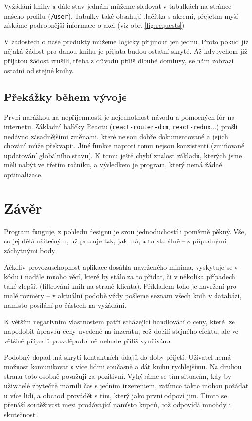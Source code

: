 \documentclass[a4paper,oneside,12pt]{report}
\begin{document}
Vyžádání knihy a dále stav jednání můžeme sledovat v\,\,tabulkách na stránce našeho
profilu (\texttt{/user}). Tabulky také obsahují tlačítka s akcemi, přejetím myší
získáme podrobnější informace o akci (viz obr. \ref{fig:requests})

V žádostech o naše produkty můžeme logicky přijmout jen jednu. Proto pokud již nějaká
žádost pro danou knihu je přijata budou ostatní skryté. Až kdybychom již přijatou žádost
zrušili, třeba z důvodů příliš dlouhé domluvy, se nám zobrazí ostatní od stejné knihy.

\section{Překážky během vývoje}
První narážkou na nepříjemnosti je nejednotnost návodů a pomocných fór na internetu.
Základní balíčky Reactu (\texttt{react-router-dom}, \texttt{react-redux}...) prošli
nedávno zásadnějšími změnami, které nejsou dobře dokumentované a jejich chování může
překvapit. Jiné funkce naproti tomu nejsou konzistentí (zmiňované updatování globálního
stavu). K tomu ještě chybí znalost základů, kterých jsme měli nabýt ve třetím ročníku, a
výsledkem je program, který nemá žádné optimalizace.

\chapter*{Závěr}
Program funguje, z pohledu designu je svou jednoduchostí i poměrně pěkný. Vše, co jej dělá
užitečným, už pracuje tak, jak má, a to stabilně -- s případnými záchytnými body.

Ačkoliv provozuschopnost aplikace dosáhla navrženého minima, vyskytuje se v kódu i nadále
mnoho věcí, které by stálo za to přidat, či v několika případech také zlepšit (filtrování
knih na straně klienta). Příkladem toho je navržení pro malé rozměry -- v aktuální podobě
vždy pošleme seznam všech knih v databázi, namísto posílání po částech na vyžádání.

K větším negativním vlastnostem patří scházející handlování o ceny, které lze napodobit
úpravou ceny uvedené na inzerátu, což docílí stejného efektu, ale ve většině případů
pravděpodobně nebude příliš využíváno.

Podobný dopad má skrytí kontaktních údajů do doby přijetí. Uživatel nemá možnost
komunikovat s více lidmi současně a dát knihu rychlejšímu. Na druhou stranu toto osobně
považuji za pozitivní. Vyhýbáme se tím situacím, kdy by uživatelé zbytečně marnili čas s
jedním inzerentem, zatímco takto mohou požádat u více lidí, a\,\,obchod provádět s tím,
který jako první odpoví jim. Tímto se přenáší soutěživost mezi prodávající namísto kupců,
což odpovídá mnohdy i skutečnosti.
\end{document}
